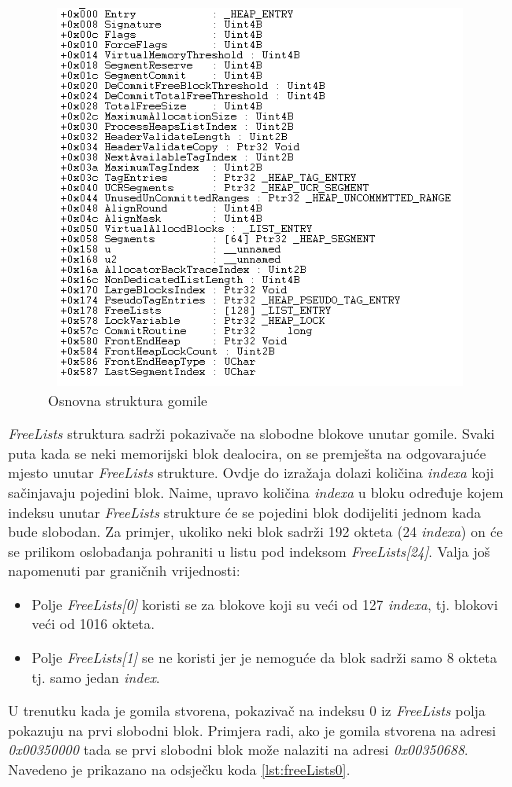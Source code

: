 \documentclass[times, utf8, diplomski, numeric]{fer}
\begin{document}
\begin{figure}[!ht]
\centering
\setlength\fboxsep{0pt}
\setlength\fboxrule{0.5pt}
\includegraphics[width=12cm, height=10cm]{slike/heap_structure}
\caption{Osnovna struktura gomile}
\label{fig:heap_structure} 
\end{figure}

\emph{FreeLists} struktura sadrži pokazivače na slobodne blokove
unutar gomile. Svaki puta kada se neki memorijski blok dealocira,
on se premješta na odgovarajuće mjesto unutar \emph{FreeLists}
strukture. Ovdje do izražaja dolazi količina \emph{indexa} koji
sačinjavaju pojedini blok. Naime, upravo količina \emph{indexa} u
bloku određuje kojem indeksu unutar \emph{FreeLists} strukture će
se pojedini blok dodijeliti jednom kada bude slobodan. Za
primjer, ukoliko neki blok sadrži 192 okteta (24 \emph{indexa})
on će se prilikom oslobađanja pohraniti u listu pod indeksom
\emph{FreeLists[24]}. Valja još napomenuti par graničnih
vrijednosti:

\begin{itemize}

\item Polje \emph{FreeLists[0]} koristi se za blokove koji su
veći od 127 \emph{indexa}, tj. blokovi veći od 1016 okteta.

\item Polje \emph{FreeLists[1]} se ne koristi jer je nemoguće da
blok sadrži samo 8 okteta tj. samo jedan \emph{index}.

\end{itemize}

U trenutku kada je gomila stvorena, pokazivač na indeksu 0 iz
\emph{FreeLists} polja pokazuju na prvi slobodni blok. Primjera
radi, ako je gomila stvorena na adresi \emph{0x00350000} tada se
prvi slobodni blok može nalaziti na adresi \emph{0x00350688}.
Navedeno je prikazano na odsječku koda \ref{lst:freeLists0}.
\end{document}
